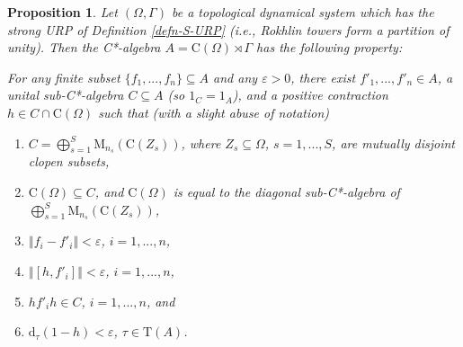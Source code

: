 \documentclass[12pt, oneside, psamsfonts]{amsart}
\newtheorem{prop}[thm]{Proposition}
\theoremstyle{definition}
\theoremstyle{remark}
\numberwithin{equation}{section}
\newcommand{\norm}[1]{\left\Vert#1\right\Vert}
\newcommand{\eps}{\varepsilon}
\newcommand{\tr}{\mathrm{T}}
\begin{document}
\begin{prop}\label{urp}
Let $(\Omega, \Gamma)$ be a topological dynamical system which has the strong URP of Definition \ref{defn-S-URP} (i.e., Rokhlin towers form a partition of unity). 
Then the C*-algebra  $A=\mathrm{C}(\Omega) \rtimes \Gamma$ has the following property:

For any finite subset $\{f_1, ..., f_n\} \subseteq A$ and any $\eps>0$, there exist $f'_1, ..., f'_n \in A$, a unital sub-C*-algebra $C \subseteq A$ (so $1_C = 1_A$), and a positive contraction $h \in C \cap \mathrm{C}(\Omega)$ such that (with a slight abuse of notation)  
\begin{enumerate}
\item 
$C = \bigoplus_{s = 1}^S \mathrm{M}_{n_s}(\mathrm{C}(Z_s))$, where $Z_s \subseteq \Omega$, $s=1, ..., S$, are mutually disjoint clopen subsets,
\item $\mathrm{C}(\Omega) \subseteq C$, and $\mathrm{C}(\Omega)$ is equal to the diagonal sub-C*-algebra of $\bigoplus_{s = 1}^S \mathrm{M}_{n_s}(\mathrm{C}(Z_s))$,
\item $\norm{f_i - f'_i} < \eps$, $i=1, ..., n$,
\item $\norm{[h, f'_i]} < \eps$, $ i =1, ..., n$, 
\item $hf'_ih \in C$, $i=1, ..., n$, and 
\item $\mathrm{d}_\tau(1-h) < \eps$, $\tau \in \tr(A)$.
\end{enumerate}
\end{prop}
\end{document}
